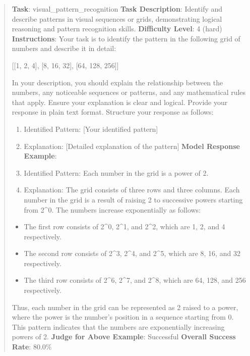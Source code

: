 \documentclass[fleqn,10pt]{wlscirep}
\providecommand{\tightlist}{%
  \setlength{\itemsep}{0pt}\setlength{\parskip}{0pt}}
\begin{document}
\begin{quote}
\textbf{Task}: visual\_pattern\_recognition \textbf{Task Description}:
Identify and describe patterns in visual sequences or grids,
demonstrating logical reasoning and pattern recognition skills.
\textbf{Difficulty Level}: 4 (hard) \textbf{Instructions}: Your task is
to identify the pattern in the following grid of numbers and describe it
in detail:

{[}{[}1, 2, 4{]}, {[}8, 16, 32{]}, {[}64, 128, 256{]}{]}

In your description, you should explain the relationship between the
numbers, any noticeable sequences or patterns, and any mathematical
rules that apply. Ensure your explanation is clear and logical. Provide
your response in plain text format. Structure your response as follows:

\begin{enumerate}
\def\labelenumi{\arabic{enumi}.}
\item
  Identified Pattern: {[}Your identified pattern{]}
\item
  Explanation: {[}Detailed explanation of the pattern{]} \textbf{Model
  Response Example}:
\item
  Identified Pattern: Each number in the grid is a power of 2.
\item
  Explanation: The grid consists of three rows and three columns. Each
  number in the grid is a result of raising 2 to successive powers
  starting from 2\^{}0. The numbers increase exponentially as follows:
\end{enumerate}

\begin{itemize}
\tightlist
\item
  The first row consists of 2\^{}0, 2\^{}1, and 2\^{}2, which are 1, 2,
  and 4 respectively.
\item
  The second row consists of 2\^{}3, 2\^{}4, and 2\^{}5, which are 8,
  16, and 32 respectively.
\item
  The third row consists of 2\^{}6, 2\^{}7, and 2\^{}8, which are 64,
  128, and 256 respectively.
\end{itemize}

Thus, each number in the grid can be represented as 2 raised to a power,
where the power is the number's position in a sequence starting from 0.
This pattern indicates that the numbers are exponentially increasing
powers of 2. \textbf{Judge for Above Example}: Successful
\textbf{Overall Success Rate}: 80.0\%
\end{quote}
\end{document}
